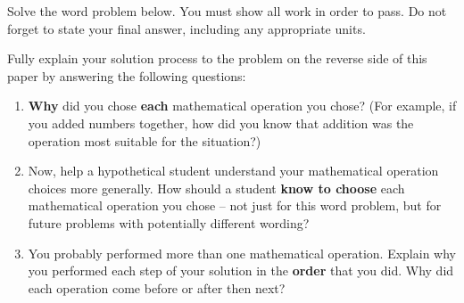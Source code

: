 
Solve the word problem below. You must show all work in order to pass. Do not forget to state your final answer, including any appropriate units.

\begin{statement}
\end{statement}

\begin{ansenv}
    \vspace{12pt}
\end{ansenv}

\newpage
{}

Fully explain your solution process to the problem on the reverse side of this paper by answering the following questions:
\begin{enumerate}
    \item \textbf{Why} did you chose \textbf{each} mathematical operation you chose? (For example, if you added numbers together, how did you know that addition was the operation most suitable for the situation?)

    \vfill

    \item Now, help a hypothetical student understand your mathematical operation choices more generally. How should a student \textbf{know to choose} each mathematical operation you chose -- not just for this word problem, but for future problems with potentially different wording?

    \vfill

    \item You probably performed more than one mathematical operation. Explain why you performed each step of your solution in the \textbf{order} that you did. Why did each operation come before or after then next?

    \vfill

\end{enumerate}